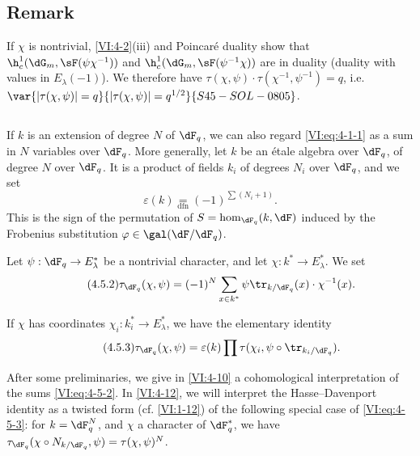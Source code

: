 \subsection{Remark}\label{VI:4-4}

If $\chi$ is nontrivial, \ref{VI:4-2}(iii) and Poincaré duality 
show that $\h_c^1(\dG_m,\sF(\psi\chi^{-1}))$ and 
$\h_c^1(\dG_m,\sF(\psi^{-1}\chi))$ are in duality (duality with values 
in $E_\lambda(-1)$). We therefore have 
$\tau(\chi,\psi)\cdot \tau(\chi^{-1},\psi^{-1}) = q$, i.e. 
$\var{|\tau(\chi,\psi)|=q}{|\tau(\chi,\psi)|=q^{1/2}}{S45-SOL-0805}$. 





\subsection{}\label{VI:4-5}

If $k$ is an extension of degree $N$ of $\dF_q$, we can also regard 
\eqref{VI:eq:4-1-1} as a sum in $N$ variables over $\dF_q$. More 
generally, let $k$ be an étale algebra over $\dF_q$, of degree $N$ over 
$\dF_q$. It is a product of fields $k_i$ of degrees $N_i$ over $\dF_q$, and we set 
\begin{equation*}\tag{4.5.1}\label{VI:eq:4-5-1}
  \varepsilon(k) \underset{\mathrm{dfn}}{=} (-1)^{\sum (N_i+1)} \text{.} 
\end{equation*}
This is the sign of the permutation of $S=\hom_{\dF_q}(k,\dF)$ induced by the 
Frobenius substitution $\varphi\in \gal(\dF/\dF_q)$. 

Let $\psi:\dF_q\to E_\lambda^\ast$ be a nontrivial character, and let 
$\chi:k^\ast \to E_\lambda^\ast$. We set 
\begin{equation*}\tag{4.5.2}\label{VI:eq:4-5-2}
  \tau_{\dF_q}(\chi,\psi) = (-1)^N \sum_{x\in k^\ast} \psi \tr_{k/\dF_q}(x) \cdot \chi^{-1}(x) \text{.} 
\end{equation*}

If $\chi$ has coordinates $\chi_i:k_i^\ast \to E_\lambda^\ast$, we 
have the elementary identity 
\begin{equation*}\tag{4.5.3}\label{VI:eq:4-5-3}
  \tau_{\dF_q}(\chi,\psi) = \varepsilon(k) \prod \tau(\chi_i,\psi\circ \tr_{k_i/\dF_q}) \text{.}
\end{equation*}

After some preliminaries, we give in \ref{VI:4-10} a 
cohomological interpretation of the sums \eqref{VI:eq:4-5-2}. In 
\ref{VI:4-12}, we will interpret the Hasse--Davenport identity as a 
twisted form (cf. \ref{VI:1-12}) of the following special case of 
\eqref{VI:eq:4-5-3}: for $k=\dF_q^N$, and $\chi$ a character of 
$\dF_q^\ast$, we have 
$\tau_{\dF_q}(\chi\circ N_{k/\dF_q},\psi)=\tau(\chi,\psi)^N$. 





